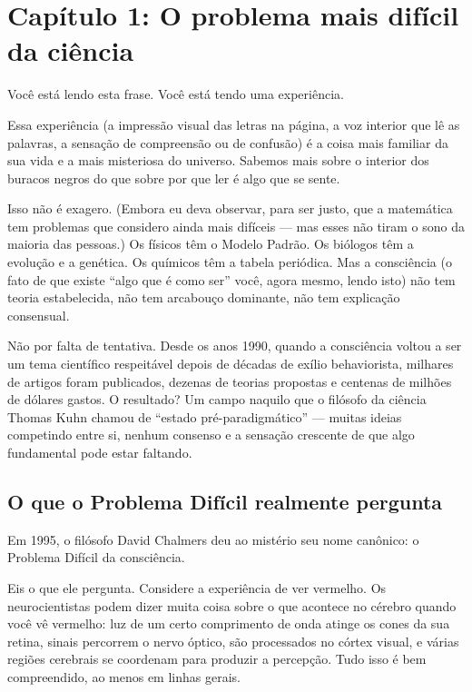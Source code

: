 \documentclass[11pt, twoside, openright]{book}
\begin{document}
\mainmatter
\pagestyle{fancy}
\chapter*{Capítulo 1: O problema mais difícil da ciência}

Você está lendo esta frase. Você está tendo uma experiência.

Essa experiência (a impressão visual das letras na página, a voz interior que lê as palavras, a sensação de compreensão ou de confusão) é a coisa mais familiar da sua vida e a mais misteriosa do universo. Sabemos mais sobre o interior dos buracos negros do que sobre por que ler é algo que se sente.

Isso não é exagero. (Embora eu deva observar, para ser justo, que a matemática tem problemas que considero ainda mais difíceis --- mas esses não tiram o sono da maioria das pessoas.) Os físicos têm o Modelo Padrão. Os biólogos têm a evolução e a genética. Os químicos têm a tabela periódica. Mas a consciência (o fato de que existe ``algo que é como ser'' você, agora mesmo, lendo isto) não tem teoria estabelecida, não tem arcabouço dominante, não tem explicação consensual.

Não por falta de tentativa. Desde os anos 1990, quando a consciência voltou a ser um tema científico respeitável depois de décadas de exílio behaviorista, milhares de artigos foram publicados, dezenas de teorias propostas e centenas de milhões de dólares gastos. O resultado? Um campo naquilo que o filósofo da ciência Thomas Kuhn chamou de ``estado pré-paradigmático'' --- muitas ideias competindo entre si, nenhum consenso e a sensação crescente de que algo fundamental pode estar faltando.

\section*{O que o Problema Difícil realmente pergunta}

Em 1995, o filósofo David Chalmers deu ao mistério seu nome canônico: o Problema Difícil da consciência.

Eis o que ele pergunta. Considere a experiência de ver vermelho. Os neurocientistas podem dizer muita coisa sobre o que acontece no cérebro quando você vê vermelho: luz de um certo comprimento de onda atinge os cones da sua retina, sinais percorrem o nervo óptico, são processados no córtex visual, e várias regiões cerebrais se coordenam para produzir a percepção. Tudo isso é bem compreendido, ao menos em linhas gerais.
\end{document}
